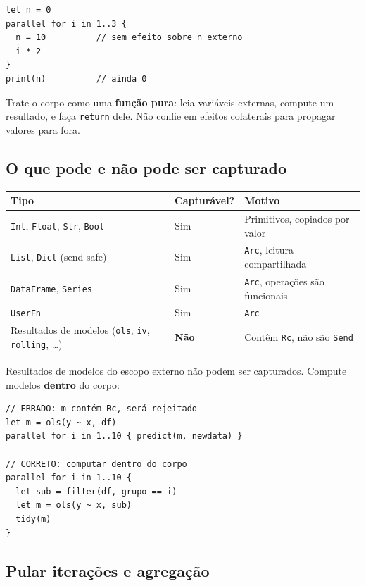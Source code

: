\begin{lstlisting}[caption={Mutações são descartadas}]
let n = 0
parallel for i in 1..3 {
  n = 10          // sem efeito sobre n externo
  i * 2
}
print(n)          // ainda 0
\end{lstlisting}

\begin{aviso}
  Trate o corpo como uma \textbf{função pura}: leia variáveis externas,
  compute um resultado, e faça \texttt{return} dele. Não confie em
  efeitos colaterais para propagar valores para fora.
\end{aviso}

\subsection*{O que pode e não pode ser capturado}

\begin{center}
\begin{tabular}{lll}
\toprule
\textbf{Tipo} & \textbf{Capturável?} & \textbf{Motivo} \\
\midrule
\texttt{Int}, \texttt{Float}, \texttt{Str}, \texttt{Bool} & Sim & Primitivos, copiados por valor \\
\texttt{List}, \texttt{Dict} (send-safe) & Sim & \texttt{Arc}, leitura compartilhada \\
\texttt{DataFrame}, \texttt{Series} & Sim & \texttt{Arc}, operações são funcionais \\
\texttt{UserFn} & Sim & \texttt{Arc} \\
Resultados de modelos (\texttt{ols}, \texttt{iv}, \texttt{rolling}, \ldots) & \textbf{Não} & Contêm \texttt{Rc}, não são \texttt{Send} \\
\bottomrule
\end{tabular}
\end{center}

Resultados de modelos do escopo externo não podem ser capturados. Compute
modelos \textbf{dentro} do corpo:

\begin{lstlisting}[caption={Modelos devem ser computados dentro}]
// ERRADO: m contém Rc, será rejeitado
let m = ols(y ~ x, df)
parallel for i in 1..10 { predict(m, newdata) }

// CORRETO: computar dentro do corpo
parallel for i in 1..10 {
  let sub = filter(df, grupo == i)
  let m = ols(y ~ x, sub)
  tidy(m)
}
\end{lstlisting}

\subsection*{Pular iterações e agregação}

